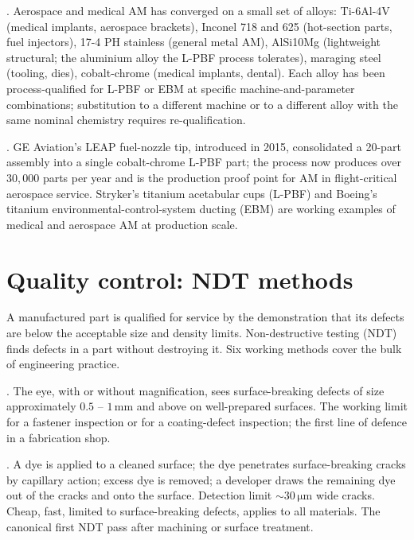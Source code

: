 .
Aerospace and medical AM has converged on a small set of alloys:
Ti-6Al-4V (medical implants, aerospace brackets), Inconel 718 and
625 (hot-section parts, fuel injectors), 17-4 PH stainless (general
metal AM), AlSi10Mg (lightweight structural; the aluminium alloy
the L-PBF process tolerates), maraging steel (tooling, dies),
cobalt-chrome (medical implants, dental). Each alloy has been
process-qualified for L-PBF or EBM at specific machine-and-parameter
combinations; substitution to a different machine or to a different
alloy with the same nominal chemistry requires re-qualification.

. GE Aviation's LEAP fuel-nozzle tip,
introduced in 2015, consolidated a 20-part assembly into a single
cobalt-chrome L-PBF part; the process now produces over $30{,}000$
parts per year and is the production proof point for AM in
flight-critical aerospace service. Stryker's titanium acetabular cups
(L-PBF) and Boeing's titanium environmental-control-system ducting
(EBM) are working examples of medical and aerospace AM at production
scale.

\section{Quality control: NDT methods}

A manufactured part is qualified for service by the demonstration
that its defects are below the acceptable size and density limits.
Non-destructive testing (NDT) finds defects in a part without
destroying it. Six working methods cover the bulk of engineering
practice.

. The eye, with or without
magnification, sees surface-breaking defects of size approximately
$0.5$ -- $1\,\text{mm}$ and above on well-prepared surfaces. The
working limit for a fastener inspection or for a coating-defect
inspection; the first line of defence in a fabrication shop.

. A dye is applied to a
cleaned surface; the dye penetrates surface-breaking cracks by
capillary action; excess dye is removed; a developer draws the
remaining dye out of the cracks and onto the surface. Detection
limit $\sim 30\,\si{\micro\meter}$ wide cracks. Cheap, fast,
limited to surface-breaking defects, applies to all materials. The
canonical first NDT pass after machining or surface treatment.

